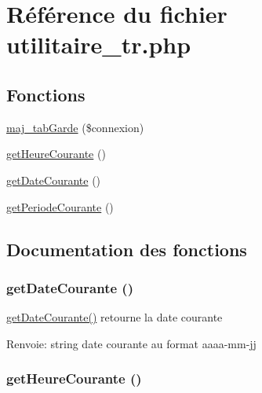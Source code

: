 \hypertarget{utilitaire__tr_8php}{
\section{R\'{e}f\'{e}rence du fichier utilitaire\_\-tr.php}
\label{utilitaire__tr_8php}
}
\subsection*{Fonctions}
\begin{CompactItemize}
\item 
\hyperlink{utilitaire__tr_8php_a0}{maj\_\-tab\-Garde} (\$connexion)
\item 
\hyperlink{utilitaire__tr_8php_a1}{get\-Heure\-Courante} ()
\item 
\hyperlink{utilitaire__tr_8php_a2}{get\-Date\-Courante} ()
\item 
\hyperlink{utilitaire__tr_8php_a3}{get\-Periode\-Courante} ()
\end{CompactItemize}


\subsection{Documentation des fonctions}
\hypertarget{utilitaire__tr_8php_a2}{
\subsubsection[getDateCourante]{\setlength{\rightskip}{0pt plus 5cm}get\-Date\-Courante ()}}
\label{utilitaire__tr_8php_a2}


\hyperlink{utilitaire__tr_8php_a2}{get\-Date\-Courante()} retourne la date courante \begin{Desc}
\item[Renvoie:]string date courante au format aaaa-mm-jj \end{Desc}
\hypertarget{utilitaire__tr_8php_a1}{
\subsubsection[getHeureCourante]{\setlength{\rightskip}{0pt plus 5cm}get\-Heure\-Courante ()}}
\label{utilitaire__tr_8php_a1}


